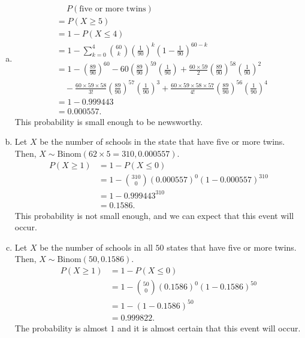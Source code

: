 \documentclass[14pt]{elegantbook}
\begin{document}
    \begin{solution}
        \begin{enumerate}[(a)]
            \item \begin{align*}
                &\quad\ P(\text{five or more twins})\\
                &=P(X\geq 5)\\
                &=1-P(X\leq 4)\\
                &=1-\sum_{k=0}^4\binom{60}{k}\left(\frac{1}{90}\right)^k\left(1-\frac{1}{90}\right)^{60-k}\\
                &=1-\left(\frac{89}{90}\right)^{60}-60\left(\frac{89}{90}\right)^{59}\left(\frac{1}{90}\right)+\frac{60\times59}{2}\left(\frac{89}{90}\right)^{58}\left(\frac{1}{90}\right)^2\\
                &\quad -\frac{60\times59\times58}{3!}\left(\frac{89}{90}\right)^{57}\left(\frac{1}{90}\right)^3+\frac{60\times59\times58\times57}{4!}\left(\frac{89}{90}\right)^{56}\left(\frac{1}{90}\right)^4\\
                &=1-0.999443\\
                &=0.000557. 
            \end{align*}
            This probability is small enough to be newsworthy. 
            \item Let $X$ be the number of schools in the state that have five or more twins. Then, $X\sim\text{Binom}(62\times 5=310, 0.000557)$. 
            \begin{align*}
                P(X\geq 1)&=1-P(X\leq 0)\\
                &=1-\binom{310}{0}\left(0.000557\right)^0\left(1-0.000557\right)^{310}\\
                &=1-0.999443^{310}\\
                &=0.1586. 
            \end{align*}
            This probability is not small enough, and we can expect that this event will occur. 
            \item Let $X$ be the number of schools in all $50$ states that have five or more twins. Then, $X\sim\text{Binom}(50, 0.1586)$. 
            \begin{align*}
                P(X\geq 1)&=1-P(X\leq 0)\\
                &=1-\binom{50}{0}\left(0.1586\right)^0\left(1-0.1586\right)^{50}\\
                &=1-(1-0.1586)^{50}\\
                &=0.999822. 
            \end{align*}
            The probability is almost $1$ and it is almost certain that this event will occur.
        \end{enumerate}
    \end{solution}
\end{document}
